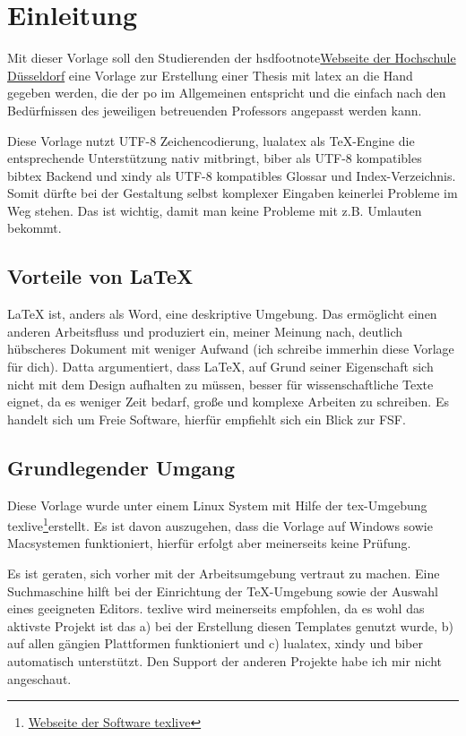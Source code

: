 \newpage

\section{Einleitung}
Mit dieser Vorlage soll den Studierenden der \gls{hsd}footnote{\href{https://www.hs-duesseldorf.de}{Webseite der Hochschule Düsseldorf}} eine Vorlage zur Erstellung einer Thesis mit \gls{latex} an die Hand gegeben werden, die der \gls{po} im Allgemeinen entspricht und die einfach nach den Bedürfnissen des jeweiligen betreuenden Professors angepasst werden kann.

Diese Vorlage nutzt UTF-8 Zeichencodierung, lualatex als TeX-Engine die entsprechende Unterstützung nativ mitbringt, biber als UTF-8 kompatibles bibtex Backend und xindy als UTF-8 kompatibles Glossar und Index-Verzeichnis. Somit dürfte bei der Gestaltung selbst komplexer Eingaben keinerlei Probleme im Weg stehen. Das ist wichtig, damit man keine Probleme mit z.B. Umlauten bekommt.

\subsection{Vorteile von LaTeX}
LaTeX ist, anders als Word, eine deskriptive Umgebung. Das ermöglicht einen anderen Arbeitsfluss und produziert ein, meiner Meinung nach, deutlich hübscheres Dokument mit weniger Aufwand (ich schreibe immerhin diese Vorlage für dich). Datta argumentiert, dass \LaTeX{}, auf Grund seiner Eigenschaft sich nicht mit dem Design aufhalten zu müssen, besser für wissenschaftliche Texte eignet, da es weniger Zeit bedarf, große und komplexe Arbeiten zu schreiben.
Es handelt sich um Freie Software, hierfür empfiehlt sich ein Blick zur \gls{FSF}.

\subsection{Grundlegender Umgang}
Diese Vorlage wurde unter einem Linux System mit Hilfe der tex-Umgebung texlive\footnote{\href{https://tug.org/texlive/}{Webseite der Software texlive}}erstellt. Es ist davon auszugehen, dass die Vorlage auf Windows sowie Macsystemen funktioniert, hierfür erfolgt aber meinerseits keine Prüfung.

Es ist geraten, sich vorher mit der Arbeitsumgebung vertraut zu machen. Eine Suchmaschine hilft bei der Einrichtung der TeX-Umgebung sowie der Auswahl eines geeigneten Editors. texlive wird meinerseits empfohlen, da es wohl das aktivste Projekt ist das a) bei der Erstellung diesen Templates genutzt wurde, b) auf allen gängien Plattformen funktioniert und c) lualatex, xindy und biber automatisch unterstützt. Den Support der anderen Projekte habe ich mir nicht angeschaut.

